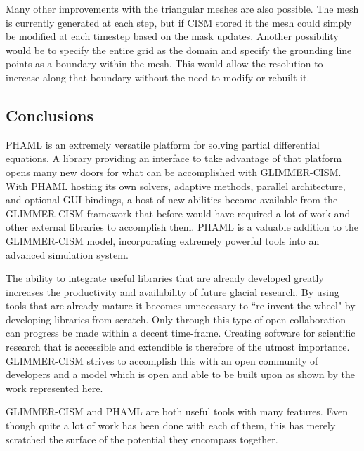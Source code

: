 Many other improvements with the triangular meshes are also possible.  The mesh is currently generated at each step, but if CISM stored it the mesh could simply be modified at each timestep based on the mask updates.  Another possibility would be to specify the entire grid as the domain and specify the grounding line points as a boundary within the mesh.  This would allow the resolution to increase along that boundary without the need to modify or rebuilt it.


\subsection{Conclusions}\label{sec:chp6conc}
PHAML is an extremely versatile platform for solving partial differential equations.  A library providing an interface to take advantage of that platform opens many new doors for what can be accomplished with GLIMMER-CISM.  With PHAML hosting its own solvers, adaptive methods, parallel architecture, and optional GUI bindings, a host of new abilities become available from the GLIMMER-CISM framework that before would have required a lot of work and other external libraries to accomplish them.  PHAML is a valuable addition to the GLIMMER-CISM model, incorporating extremely powerful tools into an advanced simulation system.


The ability to integrate useful libraries that are already developed greatly increases the productivity and availability of future glacial research.  By using tools that are already mature it becomes unnecessary to ``re-invent the wheel" by developing libraries from scratch.  Only through this type of open collaboration can progress be made within a decent time-frame.  Creating software for scientific research that is accessible and extendible is therefore of the utmost importance.  GLIMMER-CISM strives to accomplish this with an open community of developers and a model which is open and able to be built upon as shown by the work represented here. 
  

GLIMMER-CISM and PHAML are both useful tools with many features.  Even though quite a lot of work has been done with each of them, this has merely scratched the surface of the potential they encompass together.  %




